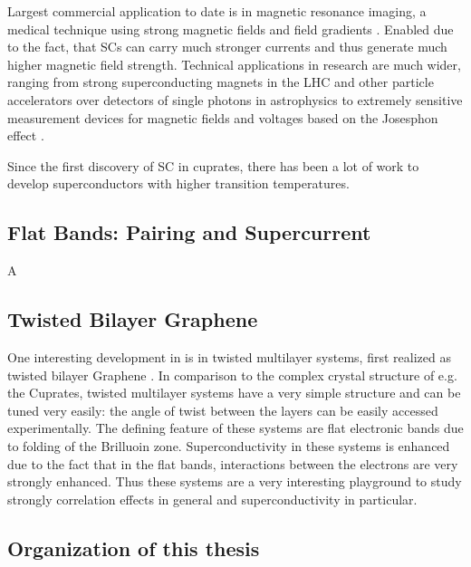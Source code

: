 \documentclass[../notes.tex]{subfiles}
\begin{document}
Largest commercial application to date is in magnetic resonance imaging, a medical technique using strong magnetic fields and field gradients \cite{rinckMagneticResonanceMedicine}.
Enabled due to the fact, that SCs can carry much stronger currents and thus generate much higher magnetic field strength.
Technical applications in research are much wider, ranging from strong superconducting magnets in the LHC \cite{tollestrupDevelopmentSuperconductingMagnets2008, rossiParticleAcceleratorsCuprate2023} and other particle accelerators over detectors of single photons in astrophysics \cite{irwinTransitionEdgeSensors2005} to extremely sensitive measurement devices for magnetic fields \cite{faleyHighTcSQUIDBiomagnetometers2017} and voltages \cite{klushinPresentFutureHightemperature2020} based on the Josesphon effect \cite{josephsonPossibleNewEffects1962}.


Since the first discovery of SC in cuprates, there has been a lot of work to develop superconductors with higher transition temperatures.

\subsection*{Flat Bands: Pairing and Supercurrent}

A 

\subsection*{Twisted Bilayer Graphene}

One interesting development in is in twisted multilayer systems, first realized as twisted bilayer Graphene \cite{caoUnconventionalSuperconductivityMagicangle2018}.
In comparison to the complex crystal structure of e.g. the Cuprates, twisted multilayer systems have a very simple structure and can be tuned very easily: the angle of twist between the layers can be easily accessed experimentally.
The defining feature of these systems are flat electronic bands due to folding of the Brilluoin zone.
Superconductivity in these systems is enhanced due to the fact that in the flat bands, interactions between the electrons are very strongly enhanced.
Thus these systems are a very interesting playground to study strongly correlation effects in general and superconductivity in particular.

\subsection*{Organization of this thesis}
\end{document}
